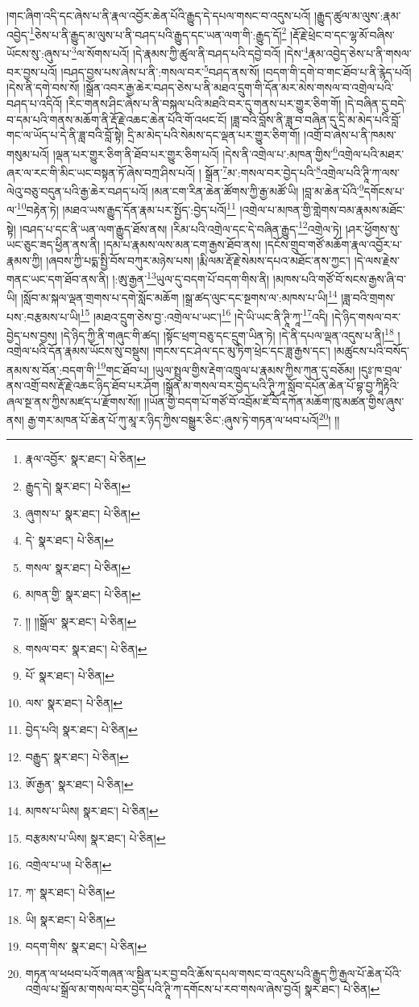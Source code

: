 །གང་ཞིག་འདི་དང་ཞེས་པ་ནི་རྣལ་འབྱོར་ཆེན་པོའི་རྒྱུད་དེ་དཔལ་གསང་བ་འདུས་པའོ། །རྒྱུད་ཚུལ་མ་ལུས་:རྣམ་འབྱེད་\footnote{རྣལ་འབྱོར་  སྣར་ཐང་།  པེ་ཅིན། }ཅེས་པ་ནི་རྒྱུད་མ་ལུས་པ་ནི་བཤད་པའི་རྒྱུད་དང་ཡན་ལག་གི་:རྒྱུད་དོ།\footnote{རྒྱུད་དེ།  སྣར་ཐང་།  པེ་ཅིན། } །རྡོ་རྗེ་ཕྲེང་བ་དང་ལྷ་མོ་བཞིས་ཡོངས་སུ་:ཞུས་པ་\footnote{ཞུགས་པ་  སྣར་ཐང་།  པེ་ཅིན། }ལ་སོགས་པའོ། །དེ་རྣམས་ཀྱི་ཚུལ་ནི་བཤད་པའི་དབྱེ་བའོ། །དེས་\footnote{དེ་  སྣར་ཐང་།  པེ་ཅིན། }རྣམ་འབྱེད་ཅེས་པ་ནི་གསལ་བར་བྱས་པའོ། །བཤད་བྱས་པས་ཞེས་པ་ནི་:གསལ་བར་\footnote{གསལ་  སྣར་ཐང་།  པེ་ཅིན། }བཤད་ནས་སོ། །བདག་གི་དགེ་བ་གང་ཐོབ་པ་ནི་རྙེད་པའོ། །དེས་ནི་དགེ་བས་སོ། །སྒྲོན་འབར་རྒྱ་ཆེར་བཤད་ཅེས་པ་ནི་མཐའ་དྲུག་གི་དོན་མར་མེས་གསལ་བ་འགྲེལ་པའི་བཤད་པ་འདིའོ། །རིང་གནས་ཤིང་ཞེས་པ་ནི་བསྐལ་པའི་མཐའི་བར་དུ་གནས་པར་གྱུར་ཅིག་གོ། །དེ་བཞིན་དུ་བདེ་བ་དམ་པའི་གནས་མཆོག་ནི་རྡོ་རྗེ་འཆང་ཆེན་པོའི་གོ་འཕང་ངོ། །ཟླ་བའི་བློས་ནི་ཟླ་བ་བཞིན་དུ་དྲི་མ་མེད་པའི་བློ་གང་ལ་ཡོད་པ་དེ་ནི་ཟླ་བའི་བློ་སྟེ། དྲི་མ་མེད་པའི་སེམས་དང་ལྡན་པར་གྱུར་ཅིག་གོ། །འགྲོ་བ་ཞེས་པ་ནི་ཁམས་གསུམ་པའོ། །ལྡན་པར་གྱུར་ཅིག་ནི་ཐོབ་པར་གྱུར་ཅིག་པའོ། །དེས་ནི་འགྲེལ་པ་:མཁན་གྱིས་\footnote{མཁན་གྱི་  སྣར་ཐང་།  པེ་ཅིན། }འགྲེལ་པའི་མཐར་ཞར་ལ་རང་གི་མིང་ཡང་བསྟན་ཏོ་ཞེས་བཀྲ་ཤིས་པའོ། །
སྒྲོན་\footnote{།། །།སྒྲོལ་  སྣར་ཐང་།  པེ་ཅིན། }མ་:གསལ་བར་བྱེད་པའི་\footnote{གསལ་བར་  སྣར་ཐང་།  པེ་ཅིན། }འགྲེལ་པའི་ཊཱི་ཀ་ལས་ལེའུ་བཅུ་བདུན་པའི་རྒྱ་ཆེར་བཤད་པའོ། །མན་ངག་རིན་ཆེན་ཚོགས་ཀྱི་རྒྱ་མཚོ་ཡི། །བླ་མ་ཆེན་པོའི་\footnote{པོ་  སྣར་ཐང་།  པེ་ཅིན། }དགོངས་པ་ལ་\footnote{ལས་  སྣར་ཐང་།  པེ་ཅིན། }བརྟེན་ཏེ། །མཐའ་ཡས་རྒྱུད་དོན་རྣམ་པར་སྤྱོད་:བྱེད་པའོ།\footnote{བྱེད་པའི།  སྣར་ཐང་།  པེ་ཅིན། } །འགྲེལ་པ་མཁན་གྱི་གླེགས་བམ་རྣམས་མཐོང་སྟེ། །བཤད་པ་དང་ནི་ཡན་ལག་རྒྱུད་ཐོས་ནས། །རིམ་པའི་འགྲེལ་དང་དེ་བཞིན་རྒྱུད་\footnote{བརྒྱུད་  སྣར་ཐང་།  པེ་ཅིན། }འགྲེལ་ཏེ། །ཤར་ཕྱོགས་སུ་ཡང་ཅུང་ཟད་ཕྱིན་ནས་ནི། །དམ་པ་རྣམས་ལས་མན་ངག་རྒྱས་ཐོབ་ནས། །དངོས་གྲུབ་གཙོ་མཆོག་རྣལ་འབྱོར་པ་རྣམས་ཀྱི། །ཞབས་ཀྱི་པདྨ་སྤྱི་བོས་བཀུར་མཉེས་པས། །རྨི་ལམ་རྡོ་རྗེ་སེམས་དཔའ་མཐོང་ནས་ཀྱང་། །དེ་ལས་རྗེས་གནང་ཡང་དག་ཐོབ་ནས་ནི། །:ཨུ་རྒྱན་\footnote{ཨོ་རྒྱན་  སྣར་ཐང་།  པེ་ཅིན། }ཡུལ་དུ་བདག་པོ་བདག་གིས་ནི། །མཁས་པའི་གཙོ་བོ་སངས་རྒྱས་ཞི་བ་ཡི། །སློབ་མ་སྐལ་ལྡན་གྲགས་པ་དགེ་སློང་མཆོག །སྒྲ་ཚད་ལུང་དང་སྔགས་ལ་:མཁས་པ་ཡི།\footnote{མཁས་པ་ཡིས།  སྣར་ཐང་།  པེ་ཅིན། } །ཟླ་བའི་གྲགས་པས་:བརྩམས་པ་ཡི།\footnote{བརྩམས་པ་ཡིས།  སྣར་ཐང་།  པེ་ཅིན། } །མཐའ་དྲུག་ཅེས་བྱ་:འགྲེལ་པ་ཡང་།\footnote{འགྲེལ་པ་ཡ།  པེ་ཅིན། } །དེ་ཡི་ཡང་ནི་ཊཱི་ཀཱ་\footnote{ཀ་  སྣར་ཐང་།  པེ་ཅིན། }འདི། །དེ་ཉིད་གསལ་བར་བྱེད་པས་བྱས། །དེ་ཉིད་ཀྱི་ནི་གཞུང་གི་ཚད། །སྟོང་ཕྲག་བཅུ་དང་དྲུག་ཡིན་ཏེ། །དེ་ནི་དཔལ་ལྡན་འདུས་པ་ནི།\footnote{ཡི།  སྣར་ཐང་།  པེ་ཅིན། } །འགྲེལ་པའི་དོན་རྣམས་ཡོངས་སུ་བསྡུས། །གངས་དང་ཤེལ་དང་མུ་ཏིག་ཕྲེང་དང་ཟླ་རྒྱས་དང་། །མཚུངས་པའི་བསོད་ནམས་ས་བོན་:བདག་གི་\footnote{བདག་གིས་  སྣར་ཐང་།  པེ་ཅིན། }གང་ཐོབ་པ། །ཡུལ་སྤྲུལ་གྱིས་རྡེག་འཁྲུལ་པ་རྣམས་ཀྱིས་ཀུན་དུ་བཅོམ། །དུཿ་ཁ་བྲལ་ནས་འགྲོ་བས་རྡོ་རྗེ་འཆང་ཉིད་ཐོབ་པར་ཤོག །སྒྲོན་མ་གསལ་བར་བྱེད་པའི་ཊཱི་ཀཱ་སློབ་དཔོན་ཆེན་པོ་བྷ་བྱ་ཀཱིརྟིའི་ཞལ་སྔ་ནས་ཀྱིས་མཛད་པ་རྫོགས་སོ།། །།ཡོན་གྱི་བདག་པོ་གཙོ་བོ་འབྲོམ་ཇོ་བོ་དཀོན་མཆོག་ཁུ་མཚན་གྱིས་ཞུས་ནས། རྒྱ་གར་མཁན་པོ་ཆེན་པོ་ཀུ་མཱ་ར་ཉིད་ཀྱིས་བསྒྱུར་ཅིང་:ཞུས་ཏེ་གཏན་ལ་ཕབ་པའོ།\footnote{གཏན་ལ་ཕཕབ་པའོ་གཞན་ལ་སྦྱིན་པར་བྱ་བའི་ཆོས་དཔལ་གསང་བ་འདུས་པའི་རྒྱུད་ཀྱི་རྒྱལ་པོ་ཆེན་པོའི་འགྲེལ་པ་སྒྲོལ་མ་གསལ་བར་བྱེད་པའི་ཊཱི་ཀ་དགོངས་པ་རབ་གསལ་ཞེས་བྱའོ།  སྣར་ཐང་།  པེ་ཅིན། }། །།